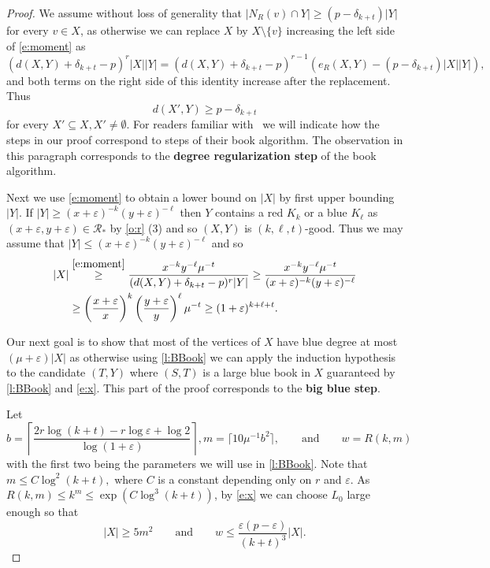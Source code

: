 \documentclass[reqno,final,12pt]{amsart}
\newcommand{\eps}{\varepsilon}
\newcommand{\mc}[1]{\mathcal{#1}}
\newcommand{\fs}[2]{\left(\frac{#1}{#2}\right)}
\begin{document}
\begin{proof}
We assume without loss of generality that $|N_R(v) \cap Y| \geq (p-\delta_{k+t})|Y|$ for every $v \in X$, as otherwise we can replace $X$ by $X \setminus \{v\}$ increasing the left side of \eqref{e:moment} as  $$(d(X,Y) + \delta_{k+t} - p)^r |X||Y| = (d(X,Y) + \delta_{k+t} - p)^{r-1}(e_R(X,Y)-(p-\delta_{k+t})|X||Y|),$$
and both terms on the right side of this identity increase after the replacement. Thus   \begin{equation}\label{e:degreg}d(X',Y) \geq p-\delta_{k+t}\end{equation}  for every $X' \subseteq X, X' \neq \emptyset.$ For readers familiar with~\cite{CGMS23} we will indicate  how the steps in our proof  correspond to steps of  their book algorithm. The observation in this paragraph corresponds to the \textbf{degree regularization step} of the book algorithm.

Next we use \eqref{e:moment} to obtain a lower bound on $|X|$ by first upper bounding $|Y|$. 
If $|Y| \geq (x+\eps)^{-k} (y + \eps)^{-\ell}$ then $Y$ contains a red $K_k$ or a blue $K_{\ell}$  as $(x+\eps, y +\eps) \in \mc{R_*}$ by \cref{o:r} (3) and so  $(X,Y)$ is $(k,\ell,t)$-good.
Thus we may assume that $|Y| \leq  (x+\eps)^{-k} (y + \eps)^{-\ell}$ and so \begin{align} \label{e:x}|X| &\stackrel{\eqref{e:moment}}{\geq}  \frac{ x^{-k}y^{-\ell}\mu^{-t }}{(d(X,Y) + \delta_{k+t} - p)^r|Y|} \geq \frac{ x^{-k}y^{-\ell}\mu^{-t }}{ (x+\eps)^{-k} (y +\eps)^{-\ell}} \notag\\& \geq \fs{x+\eps}{x}^k\fs{y+\eps}{y}^{\ell}\mu^{-t} \geq (1+\eps)^{k +\ell+t}.\end{align}

Our next goal is to show that most of the vertices of $X$ have blue degree at most $(\mu+\eps)|X|$ as otherwise using \cref{l:BBook}  we can apply the induction hypothesis to the candidate $(T,Y)$ where $(S,T)$ is a large blue book in $X$ guaranteed by 
\cref{l:BBook} and \eqref{e:x}. This part of the proof corresponds to the \textbf{big blue step}.

Let $$b =\left\lceil \frac{2r \log(k+t)- r\log{\eps} + \log{2}}{\log(1+\eps)}\right \rceil,  m = \lceil  10\mu^{-1}b^2 \rceil, \qquad \mathrm{and} \qquad w=R(k,m) $$
with the first two being the parameters we will use in  \cref{l:BBook}.
Note that $m \leq C\log^2(k+t),$ where $C$ is a constant depending only on $r$ and $\eps$.  As $R(k,m) \leq k^m \leq \exp(C\log^3(k+t))$, by \eqref{e:x} we can choose $L_0$ large enough so that \begin{equation}\label{e:x2}|X| \geq 5m^2 \qquad \mathrm{and} \qquad
w \leq \frac{\eps(p-\eps)}{(k+t)^3}|X|.\end{equation}


\end{proof}
\end{document}
